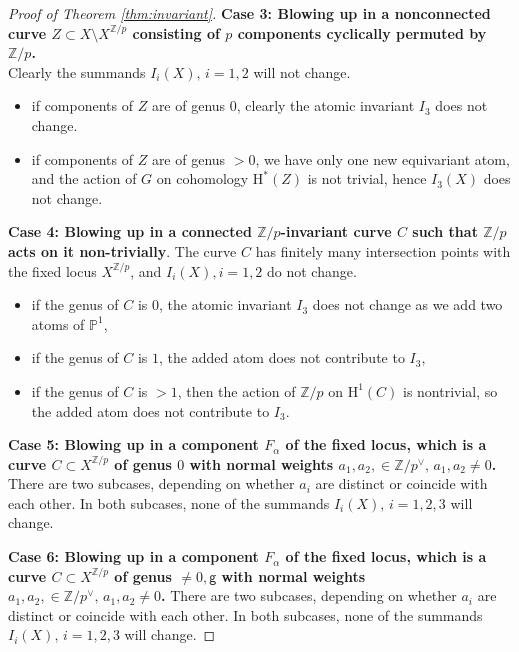 \documentclass[12pt,a4paper]{amsart}
\theoremstyle{definition}
\theoremstyle{remark}
\newcommand{\Z}{\mathbb{Z}}
\newcommand{\PP}{\mathbb{P}}
\begin{document}
\begin{proof}[Proof of Theorem \ref{thm:invariant}]
\noindent\textbf{Case 3: Blowing up in a nonconnected curve  \( Z \subset X \setminus X^{\mathbb{Z}/p} \) consisting of $p$ components cyclically permuted by $\mathbb Z/p$.} \\
Clearly the summands $I_i(X),\,i=1,2$ will not change.
  \begin{itemize}
      \item if components of $Z$ are of genus $0$, clearly the atomic invariant $I_3$ does not change.
      \item if components of $Z$ are of genus $>0$, we have only one new equivariant atom, and the action of $G$ on cohomology $\mathrm{H}^{\ast}(Z)$ is not trivial, hence $I_3(X)$ does not change.
  \end{itemize}
\medskip
\noindent\textbf{Case 4: Blowing up in  a connected $\Z/p$-invariant curve \( C\) such that $\Z/p$ acts on it non-trivially}. 
The curve $C$ has finitely many intersection points with the fixed locus $X^{\Z/p}$, and $I_i(X),i=1,2$ do not change. 
\begin{itemize}
      \item if the genus of  $C$ is $0$,  the atomic invariant $I_3$ does not change as we add two atoms of $\PP^1$,
      \item if the genus of $C$ is $1$, the added atom does not contribute to $I_3$,
      \item if the genus of $C$ is $>1$, then the action of $\Z/p$ on $\mathrm{H}^1(C)$ is nontrivial, so the added atom does not contribute to $I_3$.
  \end{itemize}
\medskip

\noindent\textbf{Case 5: Blowing up in a component $F_\alpha$ of the fixed locus, which is a curve \( C \subset X^{\mathbb{Z}/p} \) of genus $0$ with normal weights $a_1,a_2,\in \Z/p^\vee,\,a_1,a_2\ne 0$.}
There are two subcases, depending on whether $a_i$ are distinct or coincide with each other. In both subcases, none of the summands $I_i(X),\,i=1,2,3$ will change.

\medskip


\noindent\textbf{Case 6: Blowing up in a component $F_\alpha$ of the fixed locus, which is a curve \( C \subset X^{\mathbb{Z}/p} \) of genus $\ne 0,\mathsf g$ with normal weights $a_1,a_2,\in \Z/p^\vee,\,a_1,a_2\ne 0$.}
There are two subcases, depending on whether $a_i$ are distinct or coincide with each other. In both subcases, none of the summands $I_i(X),\,i=1,2,3$ will change.


\end{proof}
\end{document}
